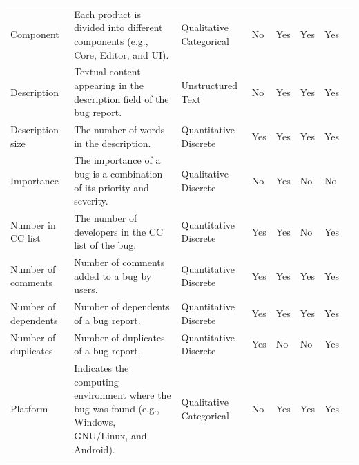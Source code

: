 \begin{table}[h!]
\begin{tabular}{@{}lp{6cm}llllll@{}}
    Component                    & Each product is divided into different components (e.g., Core, Editor, and UI).                                                                      & Qualitative Categorical           & No          &     Yes     &   Yes   & Yes\\
    Description                  & Textual content appearing in the description field of the bug  report.                                                                               & Unstructured Text            & No          &   Yes       &  Yes    & Yes\\
    Description size             & The number of words in the description.                                                                                                              & Quantitative Discrete  & Yes         &      Yes    &   Yes   & Yes\\
    Importance                   & The importance of a bug is a combination of its priority and severity.                                                                               & Qualitative Discrete           & No          &     Yes     &    No  & No\\
    Number in CC list            & The number of developers in the CC list of the bug.                                                                                                  & Quantitative Discrete  & Yes         &     Yes     &   No   & Yes\\
    Number of comments           & Number of comments added to a bug by users.                                                                                                          & Quantitative Discrete  & Yes         &      Yes    &   Yes   & Yes\\
    Number of dependents         & Number of dependents of a bug report.                                                                                                                     & Quantitative Discrete  & Yes         &      Yes    &   Yes   & Yes\\
    Number of duplicates         & Number of duplicates of a bug report.                                                                                                                   & Quantitative Discrete  & Yes         &      No    &   No   & Yes\\
    Platform                     & Indicates the computing environment where the bug was found (e.g., Windows, GNU/Linux, and Android).                                            & Qualitative Categorical            & No          &   Yes       &  Yes    & Yes\\

\end{tabular}
\end{table}
